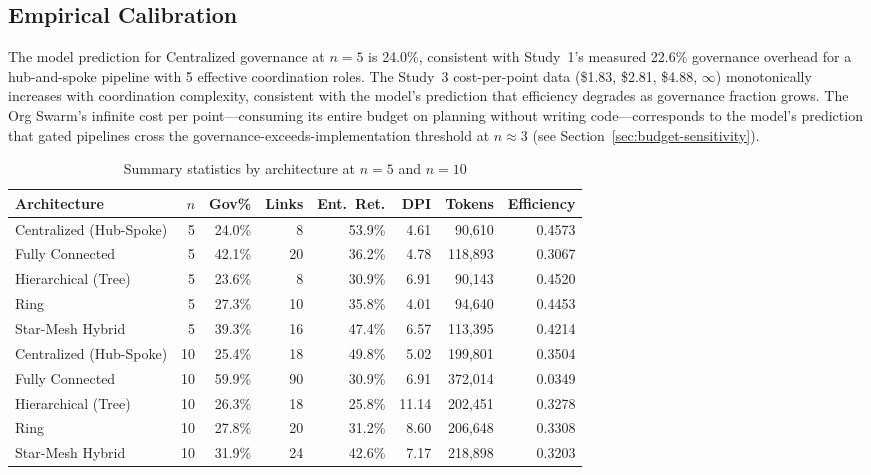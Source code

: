\documentclass[11pt,a4paper]{article}
\begin{document}
\subsection{Empirical Calibration}

The model prediction for Centralized governance at $n = 5$ is 24.0\%, consistent with Study~1's measured 22.6\% governance overhead for a hub-and-spoke pipeline with 5 effective coordination roles. The Study~3 cost-per-point data (\$1.83, \$2.81, \$4.88, $\infty$) monotonically increases with coordination complexity, consistent with the model's prediction that efficiency degrades as governance fraction grows. The Org Swarm's infinite cost per point---consuming its entire budget on planning without writing code---corresponds to the model's prediction that gated pipelines cross the governance-exceeds-implementation threshold at $n \approx 3$ (see Section~\ref{sec:budget-sensitivity}).

\begin{table}[H]
\centering
\caption{Summary statistics by architecture at $n=5$ and $n=10$}
\label{tab:token-summary}
\small
\begin{tabular}{@{}lrrrrrrr@{}}
\toprule
\textbf{Architecture} & \textbf{$n$} & \textbf{Gov\%} & \textbf{Links} & \textbf{Ent.\ Ret.} & \textbf{DPI} & \textbf{Tokens} & \textbf{Efficiency} \\
\midrule
Centralized (Hub-Spoke) & 5 & 24.0\% & 8 & 53.9\% & 4.61 & 90,610 & 0.4573 \\
Fully Connected & 5 & 42.1\% & 20 & 36.2\% & 4.78 & 118,893 & 0.3067 \\
Hierarchical (Tree) & 5 & 23.6\% & 8 & 30.9\% & 6.91 & 90,143 & 0.4520 \\
Ring & 5 & 27.3\% & 10 & 35.8\% & 4.01 & 94,640 & 0.4453 \\
Star-Mesh Hybrid & 5 & 39.3\% & 16 & 47.4\% & 6.57 & 113,395 & 0.4214 \\
\midrule
Centralized (Hub-Spoke) & 10 & 25.4\% & 18 & 49.8\% & 5.02 & 199,801 & 0.3504 \\
Fully Connected & 10 & 59.9\% & 90 & 30.9\% & 6.91 & 372,014 & 0.0349 \\
Hierarchical (Tree) & 10 & 26.3\% & 18 & 25.8\% & 11.14 & 202,451 & 0.3278 \\
Ring & 10 & 27.8\% & 20 & 31.2\% & 8.60 & 206,648 & 0.3308 \\
Star-Mesh Hybrid & 10 & 31.9\% & 24 & 42.6\% & 7.17 & 218,898 & 0.3203 \\
\bottomrule
\end{tabular}
\end{table}
\end{document}

